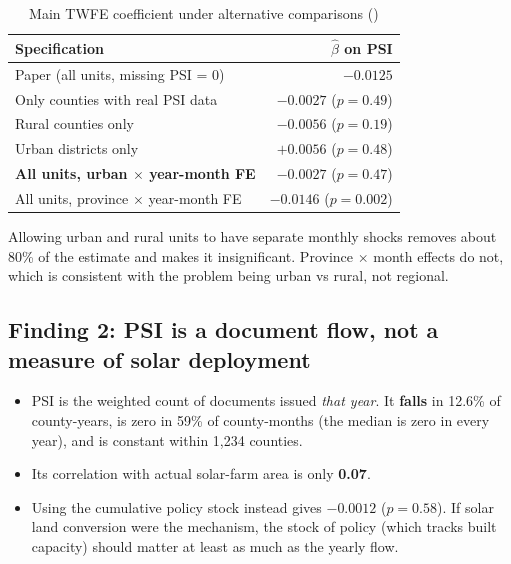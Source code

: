 \documentclass[11pt]{article}
\begin{document}
\begin{table}[H]\centering\small
\caption{Main TWFE coefficient under alternative comparisons ()}
\begin{tabularx}{\linewidth}{>{\raggedright\arraybackslash}Xr}
\toprule
Specification & $\hat\beta$ on PSI\\
\midrule
Paper (all units, missing PSI = 0) & $-0.0125$\\
Only counties with real PSI data & $-0.0027$ ($p=0.49$)\\
Rural counties only & $-0.0056$ ($p=0.19$)\\
Urban districts only & $+0.0056$ ($p=0.48$)\\
\textbf{All units, urban $\times$ year-month FE} & $\mathbf{-0.0027}$ ($p=0.47$)\\
All units, province $\times$ year-month FE & $-0.0146$ ($p=0.002$)\\
\bottomrule
\end{tabularx}
\end{table}
Allowing urban and rural units to have separate monthly shocks removes about 80\% of the estimate and makes it insignificant. Province $\times$ month effects do not, which is consistent with the problem being urban vs rural, not regional.

\subsection{Finding 2: PSI is a document flow, not a measure of solar deployment}
\begin{itemize}
\item PSI is the weighted count of documents issued \emph{that year}. It \textbf{falls} in 12.6\% of county-years, is zero in 59\% of county-months (the median is zero in every year), and is constant within 1,234 counties.
\item Its correlation with actual solar-farm area is only \textbf{0.07}.
\item Using the cumulative policy stock instead gives $-0.0012$ ($p=0.58$). If solar land conversion were the mechanism, the stock of policy (which tracks built capacity) should matter at least as much as the yearly flow.
\end{itemize}
\end{document}
